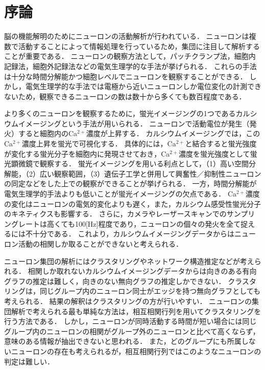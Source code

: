 \chapter{序論}
% 
% 
脳の機能解明のためにニューロンの活動解析が行われている．
ニューロンは複数で活動することによって情報処理を行っているため，集団に注目して解析することが重要である．
ニューロンの観察方法として，パッチクランプ法，細胞内記録法，細胞外記録法などの電気生理学的な手法が挙げられる．
これらの手法は十分な時間分解能かつ細胞レベルでニューロンを観察することができる．
しかし，電気生理学的な手法では電極から近いニューロンしか電位変化の計測できないため，観察できるニューロンの数は数十から多くても数百程度である．

より多くのニューロンを観察するために，蛍光イメージングの1つであるカルシウムイメージングという手法が用いられる．
ニューロンで活動電位が発生（発火）すると細胞内のCa${}^{2+}$濃度が上昇する．
カルシウムイメージングでは，このCa${}^{2+}$濃度上昇を蛍光で可視化する．
具体的には，Ca${}^{2+}$と結合すると蛍光強度が変化する蛍光分子を細胞内に発現させておき，Ca${}^{2+}$濃度を蛍光強度として蛍光顕微鏡で観察する．
蛍光イメージングを用いる利点として，（1）高い空間分解能，（2）広い観察範囲，（3）遺伝子工学と併用して興奮性／抑制性ニューロンの同定などをした上での観察ができることが挙げられる．
一方，時間分解能が電気生理学的手法よりも低いことが蛍光イメージングの欠点である．
Ca${}^{2+}$濃度の変化はニューロンの電気的変化よりも遅く，また，カルシウム感受性蛍光分子のキネティクスも影響する．
さらに，カメラやレーザースキャンでのサンプリングレートは高くても100[Hz]程度であり，ニューロンの個々の発火を全て捉えるには不十分である．
これより，カルシウムイメージングデータからはニューロン活動の相関しか取ることができないと考えられる．

ニューロン集団の解析にはクラスタリングやネットワーク構造推定などが考えられる．
相関しか取れないカルシウムイメージングデータからは向きのある有向グラフの推定は難しく，向きのない無向グラフの推定しかできない．
クラスタリングは，同じグループ内のニューロン同士がエッジを持つ無向グラフとしても考えられる．
結果の解釈はクラスタリングの方が行いやすい．
ニューロンの集団解析で考えられる最も単純な方法は，相互相関行列を用いてクラスタリングを行う方法である．
しかし，ニューロンが同時活動する時間が短い場合には同じグループ内のニューロンの相関がグループ外のニューロンと比べて高くならず，意味のある情報が抽出できないと思われる．
また，どのグループにも所属しないニューロンの存在も考えられるが，相互相関行列ではこのようなニューロンの判定は難しい．


